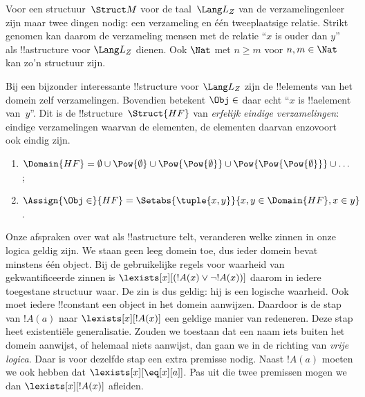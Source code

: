 \documentclass[../../../include/open-logic-section]{subfiles}
\begin{document}
\begin{ex}
Voor een structuur~$\Struct M$ voor de taal~$\Lang L_Z$ van de
verzamelingenleer zijn maar twee dingen nodig: een verzameling en één
tweeplaatsige relatie. Strikt genomen kan daarom de verzameling mensen
met de relatie ``$x$ is ouder dan $y$'' als !!a{structure} voor $\Lang
L_Z$ dienen. Ook $\Nat$ met $n \ge m$ voor $n, m \in \Nat$ kan zo'n
structuur zijn.

Bij een bijzonder interessante !!{structure} voor $\Lang L_Z$ zijn de
!!{element}s van het domein zelf verzamelingen. Bovendien betekent
$\Obj \in$ daar echt ``$x$ is !!a{element} van~$y$''. Dit is de
!!{structure}~$\Struct{{HF}}$ van \emph{erfelijk eindige
verzamelingen}: eindige verzamelingen waarvan de elementen, de elementen
daarvan enzovoort ook eindig zijn.
\begin{enumerate}
\item $\Domain{{{HF}}} = \emptyset \cup \Pow{\emptyset} \cup
  \Pow{\Pow{\emptyset}} \cup \Pow{\Pow{\Pow{\emptyset}}} \cup \dots$;
\item $\Assign{\Obj \in}{{{HF}}} = \Setabs{\tuple{x, y}}{x, y \in
  \Domain{{{HF}}}, x \in y}$.
\end{enumerate}
\end{ex}

\begin{digress}
Onze afspraken over wat als !!a{structure} telt, veranderen welke
zinnen in onze logica geldig zijn. We staan geen leeg domein toe, dus
ieder domein bevat minstens één object. Bij de gebruikelijke regels
voor waarheid van gekwantificeerde zinnen is
$\lexists[x][(!A(x) \lor \lnot !A(x))]$ daarom in iedere toegestane
structuur waar. De zin is dus geldig: hij is een logische waarheid.
Ook moet iedere !!{constant} een object in het domein aanwijzen.
Daardoor is de stap van $!A(a)$ naar $\lexists[x][!A(x)]$ een geldige
manier van redeneren. Deze stap heet existentiële generalisatie.
Zouden we toestaan dat een naam iets buiten het domein aanwijst, of
helemaal niets aanwijst, dan gaan we in de richting van
\emph{vrije logica}. Daar is voor dezelfde stap een extra premisse
nodig. Naast $!A(a)$ moeten we ook hebben dat
$\lexists[x][\eq[x][a]]$. Pas uit die twee premissen mogen we dan
$\lexists[x][!A(x)]$ afleiden.
\end{digress}
\end{document}
